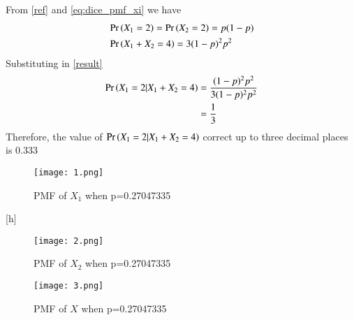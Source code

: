 \documentclass[journal,12pt,twocolumn]{IEEEtran}
\begin{document}
From \eqref{ref} and \eqref{eq:dice_pmf_xi} we have
\begin{align}
&\Pr\left(X_1=2\right)=\Pr\left(X_2=2\right)=p(1-p)\\
&\Pr\left(X_1+X_2=4\right)=3(1-p)^2p^2
\end{align}
Substituting in \eqref{result}
\begin{align}
 \Pr\left(X_1 = 2 | X_1 + X_2 = 4\right)
 &=\frac{(1-p)^2p^2}{3(1-p)^2p^2}\\
 &=\frac{1}{3}
\end{align}
Therefore, the value of
$\Pr\left(X_1 = 2 | X_1 + X_2 = 4\right)$ correct up to three decimal places is 0.333
\begin{figure}[h]
    \centering
    \texttt{[image: 1.png]}
    \caption{PMF of $X_1$ when p=0.27047335  }
    \label{1}
\end{figure}[h]
\begin{figure}
    \centering
    \texttt{[image: 2.png]}
    \caption{PMF of $X_2$ when p=0.27047335  }
    \label{2}
\end{figure}
\begin{figure}[h!]
    \centering
    \texttt{[image: 3.png]}
    \caption{PMF of $X$ when p=0.27047335  }
    \label{3}
\end{figure}
\end{document}

